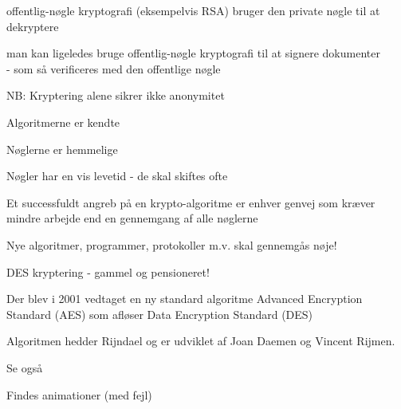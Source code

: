 \documentclass[Screen16to9,17pt]{foils}
\begin{document}


\begin{list1}
\item offentlig-nøgle kryptografi (eksempelvis RSA) bruger den private
  nøgle til at dekryptere
\item man kan ligeledes bruge offentlig-nøgle kryptografi til at
  signere dokumenter\\ - som så verificeres med den offentlige nøgle
\item NB: Kryptering alene sikrer ikke anonymitet
\end{list1}



\begin{list1}
\item Algoritmerne er kendte
\item Nøglerne er hemmelige
\item Nøgler har en vis levetid - de skal skiftes ofte
\item Et successfuldt angreb på en krypto-algoritme er enhver genvej
  som kræver mindre arbejde end en gennemgang af alle nøglerne
\item Nye algoritmer, programmer, protokoller m.v. skal gennemgås nøje!
\end{list1}



\begin{list1}
\item DES kryptering - gammel og pensioneret!
\item Der blev i 2001 vedtaget en ny standard algoritme Advanced Encryption
  Standard (AES) som afløser Data Encryption Standard (DES)
\item Algoritmen hedder Rijndael og er udviklet
af Joan Daemen og Vincent Rijmen.
\item Se også 
\item Findes animationer (med fejl) 
\end{list1}
\end{document}
